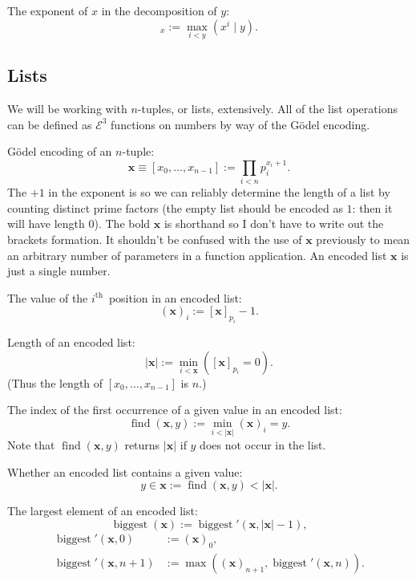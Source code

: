 \documentclass[a4paper]{article}
\newcommand{\grz}[1]{$\mathcal{E}^{#1}$}	%
\newcommand{\ith}{$i^{\textrm{th}}$~}
\newcommand{\xvec}{\mathbf{x}}	%
\newcommand{\recurN}[1]{\begin{equation*} \begin{split} #1 \end{split} \end{equation*}}	%
\newcommand{\find}{\operatorname{find}}
\theoremstyle{plain}
\theoremstyle{definition}
\begin{document}
The exponent of $x$ in the decomposition of $y$:
\begin{equation} [y]_x := \max_{i < y} \left( x^i \mid y \right). \end{equation}

\subsection{Lists}\label{sec:lists}

We will be working with $n$-tuples, or lists, extensively. All of the list operations can be defined as \grz{3} functions on numbers by way of the G\"odel encoding.

G\"odel encoding of an $n$-tuple:
\begin{equation} \xvec \equiv [x_0, \dots, x_{n-1}] := \prod_{i < n} p_i^{x_i+1}. \end{equation}
The $+1$ in the exponent is so we can reliably determine the length of a list by counting distinct prime factors (the empty list should be encoded as $1$: then it will have length $0$).
The bold $\xvec$ is shorthand so I don't have to write out the brackets formation. It shouldn't be confused with the use of $\xvec$ previously to mean an arbitrary number of parameters in a function application. An encoded list $\xvec$ is just a single number.

The value of the \ith position in an encoded list:
\begin{equation} (\xvec)_i := [\xvec]_{p_i} - 1. \end{equation}

Length of an encoded list:
\begin{equation} |\xvec| := \min_{i < \xvec} \left([\xvec]_{p_i} = 0  \right).\end{equation}
(Thus the length of $[x_0,\ldots, x_{n-1}]$ is $n$.)

The index of the first occurrence of a given value in an encoded list:
\begin{equation} \find(\xvec,y) := \min_{i < |\xvec|} (\xvec)_i = y. \end{equation}
Note that $\find(\xvec,y)$ returns $|\xvec|$ if $y$ does not occur in the list.

Whether an encoded list contains a given value:
\begin{equation} y \in \xvec := \find(\xvec,y) < |\xvec|. \end{equation}

The largest element of an encoded list:
\begin{equation} \operatorname{biggest}(\xvec) := \operatorname{biggest}'(\xvec,|\xvec|-1), \end{equation}
\recurN{
	\operatorname{biggest}'(\xvec,0) &:= (\xvec)_0, \\ 
	\operatorname{biggest}'(\xvec,n+1) &:= \max \left ( (\xvec)_{n+1},\operatorname{biggest}'(\xvec,n) \right ).
}
\end{document}
